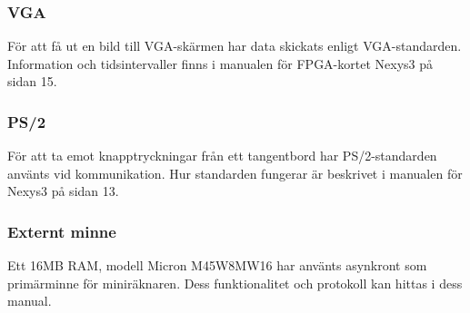 \documentclass[main.tex]{subfiles}
\begin{document}
\subsubsection*{VGA}
För att få ut en bild till VGA-skärmen har data skickats enligt
VGA-standarden. Information och tidsintervaller finns i manualen för
FPGA-kortet Nexys3 på sidan 15.\cite{Nexys3}
\subsubsection*{PS/2}
För att ta emot knapptryckningar från ett tangentbord har PS/2-standarden
använts vid kommunikation. Hur standarden fungerar är beskrivet i manualen för
Nexys3 på sidan 13.\cite{Nexys3}
\subsubsection*{Externt minne}
Ett 16MB RAM, modell Micron M45W8MW16 har använts asynkront som primärminne för
miniräknaren. Dess funktionalitet och protokoll kan hittas i dess
manual.\cite{m45}

\clearpage
\end{document}
